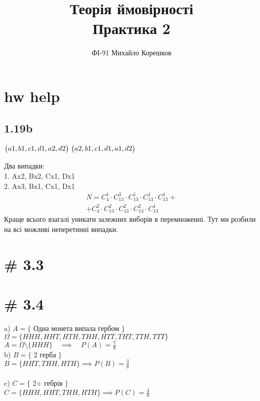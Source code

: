 \documentclass[11pt]{article} %
\title{Теорія ймовірності \\ Практика 2}
\author{ФІ-91 Михайло Корешков}
\begin{document}
\maketitle
\pagebreak

\section{hw help}
\subsection{1.19b}
$
\begin{pmatrix}
    a1, b1, c1, d1, a2, d2 \\
\end{pmatrix} \\
\begin{pmatrix}
    a2, b1, c1, d1, a1, d2 \\
\end{pmatrix}
$ 

Два випадки: \\
1. Ax2, Bx2, Cx1, Dx1 \\
2. Ax3, Bx1, Cx1, Dx1 \\
\begin{align*} 
    N = C_4^1 \cdot C_13^3 \cdot C_13^1 \cdot C_13^1 \cdot C_13^1 + \\ 
    + C_4^2 \cdot C_13^2 \cdot C_13^2 \cdot C_13^2 \cdot C_13^1
\end{align*}
Краще всього взагалі уникати залежних виборів в перемноженні. Тут ми розбили на всі можливі неперетинні випадки.


\section*{# 3.3}

\section{# 3.4}
a) $A = \{$ Одна монета випала гербом $\}$ \\
$\Omega = \{HHH, HHT, HTH, THH, HTT, THT, TTH, TTT\}$ \\
$A = \Omega \setminus \{HHH\} \quad \implies \quad P(A) = \frac{7}{8}$
\\
b) $B = \{$ 2 герба $\}$ \\
$B = \{HHT, THH, HTH\} \implies P(B) = \frac{3}{8}$ \\
\\
c) $C = \{$ 2+ гебрів $\}$ \\
$C = \{HHH, HHT, THH, HTH\} \implies P(C) = \frac{4}{8}$
\\
\end{document}
